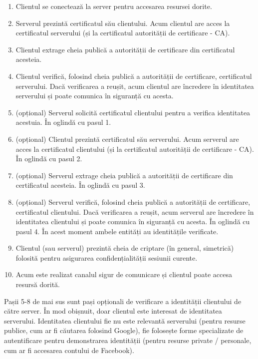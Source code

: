 \begin{enumerate}
  \item Clientul se conectează la server pentru accesarea resursei dorite.
  \item Serverul prezintă certificatul său clientului.
    Acum clientul are acces la certificatul serverului (și la certificatul autorității de certificare - CA).
  \item Clientul extrage cheia publică a autorității de certificare din certificatul acesteia.
  \item Clientul verifică, folosind cheia publică a autorității de certificare, certificatul serverului.
    Dacă verificarea a reușit, acum clientul are încredere în identitatea serverului și poate comunica în siguranță cu acesta.
  \item (opțional) Serverul solicită certificatul clientului pentru a verifica identitatea acestuia.
    În oglindă cu pasul 1.
  \item (opțional) Clientul prezintă certificatul său serverului.
    Acum serverul are acces la certificatul clientului (și la certificatul autorității de certificare - CA).
    În oglindă cu pasul 2.
  \item (opțional) Serverul extrage cheia publică a autorității de certificare din certificatul acesteia.
    În oglindă cu pasul 3.
  \item (opțional) Serverul verifică, folosind cheia publică a autorității de certificare, certificatul clientului.
    Dacă verificarea a reușit, acum serverul are încredere în identitatea clientului și poate comunica în siguranță cu acesta.
    În oglindă cu pasul 4.
    În acest moment ambele entități au identitățile verificate.
  \item Clientul (sau serverul) prezintă cheia de criptare (în general, simetrică) folosită pentru asigurarea confidențialității sesiunii curente.
  \item Acum este realizat canalul sigur de comunicare și clientul poate accesa resursă dorită.
\end{enumerate}

Pașii 5-8 de mai sus sunt pași opționali de verificare a identității clientului de către server.
În mod obișnuit, doar clientul este interesat de identitatea serverului.
Identitatea clientului fie nu este relevantă serverului (pentru resurse publice, cum ar fi căutarea folosind Google), fie folosește forme specializate de autentificare pentru demonstrarea identității (pentru resurse private / personale, cum ar fi accesarea contului de Facebook).

